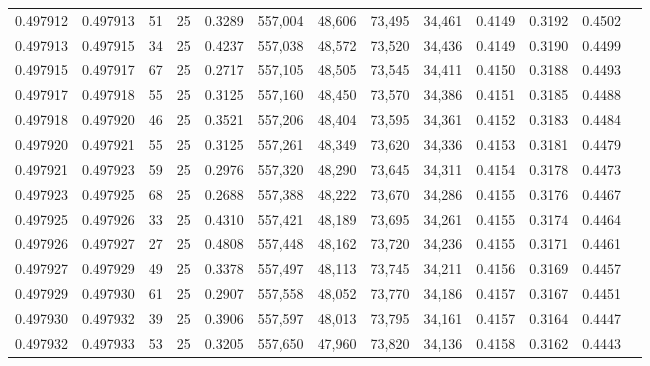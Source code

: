 \begin{tabular}{rrrrrrrrrrrrr}
0.497912 & 0.497913 &    51 &  25 &                                     0.3289 & 557,004 &  48,606 &  73,495 &  34,461 & 0.4149 & 0.3192 & 0.4502 \\
0.497913 & 0.497915 &    34 &  25 &                                     0.4237 & 557,038 &  48,572 &  73,520 &  34,436 & 0.4149 & 0.3190 & 0.4499 \\
0.497915 & 0.497917 &    67 &  25 &                                     0.2717 & 557,105 &  48,505 &  73,545 &  34,411 & 0.4150 & 0.3188 & 0.4493 \\
0.497917 & 0.497918 &    55 &  25 &                                     0.3125 & 557,160 &  48,450 &  73,570 &  34,386 & 0.4151 & 0.3185 & 0.4488 \\
0.497918 & 0.497920 &    46 &  25 &                                     0.3521 & 557,206 &  48,404 &  73,595 &  34,361 & 0.4152 & 0.3183 & 0.4484 \\
0.497920 & 0.497921 &    55 &  25 &                                     0.3125 & 557,261 &  48,349 &  73,620 &  34,336 & 0.4153 & 0.3181 & 0.4479 \\
0.497921 & 0.497923 &    59 &  25 &                                     0.2976 & 557,320 &  48,290 &  73,645 &  34,311 & 0.4154 & 0.3178 & 0.4473 \\
0.497923 & 0.497925 &    68 &  25 &                                     0.2688 & 557,388 &  48,222 &  73,670 &  34,286 & 0.4155 & 0.3176 & 0.4467 \\
0.497925 & 0.497926 &    33 &  25 &                                     0.4310 & 557,421 &  48,189 &  73,695 &  34,261 & 0.4155 & 0.3174 & 0.4464 \\
0.497926 & 0.497927 &    27 &  25 &                                     0.4808 & 557,448 &  48,162 &  73,720 &  34,236 & 0.4155 & 0.3171 & 0.4461 \\
0.497927 & 0.497929 &    49 &  25 &                                     0.3378 & 557,497 &  48,113 &  73,745 &  34,211 & 0.4156 & 0.3169 & 0.4457 \\
0.497929 & 0.497930 &    61 &  25 &                                     0.2907 & 557,558 &  48,052 &  73,770 &  34,186 & 0.4157 & 0.3167 & 0.4451 \\
0.497930 & 0.497932 &    39 &  25 &                                     0.3906 & 557,597 &  48,013 &  73,795 &  34,161 & 0.4157 & 0.3164 & 0.4447 \\
0.497932 & 0.497933 &    53 &  25 &                                     0.3205 & 557,650 &  47,960 &  73,820 &  34,136 & 0.4158 & 0.3162 & 0.4443 \\

\end{tabular}
